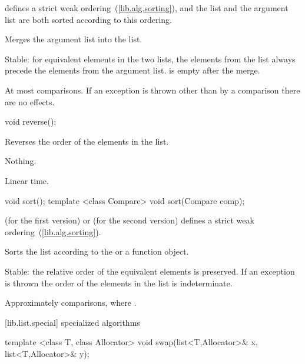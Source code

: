 \begin{itemdescr}
\pnum
\requires
{} defines a strict weak ordering~(\ref{lib.alg.sorting}), and the list and the argument list are both
sorted according to this ordering.

\pnum
\effects
Merges the argument list into the list.

\pnum
\notes
Stable: for equivalent elements in the two lists, the elements from the list
always precede the elements from the argument list.
 is empty after the merge.

\pnum
\complexity
At most
comparisons.
If an exception is thrown other than by a comparison there are no effects.
\end{itemdescr}

%
\begin{itemdecl}
void reverse();
\end{itemdecl}

\begin{itemdescr}
\pnum
\effects
Reverses the order of the elements in the list.

\pnum
\throws
Nothing.

\pnum
\complexity
Linear time.
\end{itemdescr}

%
\begin{itemdecl}
                         void sort();
template <class Compare> void sort(Compare comp);
\end{itemdecl}

\begin{itemdescr}
\pnum
\requires
{}
(for the first version) or
(for the second version)
defines a strict weak ordering~(\ref{lib.alg.sorting}).

\pnum
\effects
Sorts the list according to the  or a  function object.

\pnum
\notes
Stable: the relative order of the equivalent elements is preserved.
If an exception is thrown the order of the elements in the list is indeterminate.

\pnum
\complexity
Approximately
comparisons, where
.
\end{itemdescr}

[lib.list.special]{ specialized algorithms}

%
%
\begin{itemdecl}
template <class T, class Allocator>
  void swap(list<T,Allocator>& x, list<T,Allocator>& y);
\end{itemdecl}

